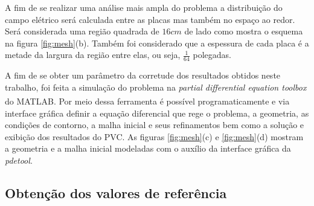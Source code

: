 \documentclass[
    12pt,               %
    openright,          %
    oneside,
    a4paper,            %
    english,            %
    french,             %
    spanish,            %
    brazil              %
    ]{abntex2}
\newcommand{\matlab}{MATLAB\textsuperscript{\textregistered}}
\begin{document}
A fim de se realizar uma análise mais ampla do problema a distribuição do campo elétrico será calculada entre as placas mas também no espaço ao redor. Será considerada uma região quadrada de $16cm$ de lado como mostra o esquema na figura \ref{fig:mesh}{(b)}. Também foi considerado que a espessura de cada placa é a metade da largura da região entre elas, ou seja, $\frac{1}{64}$ polegadas.


A fim de se obter um parâmetro da corretude dos resultados obtidos neste trabalho, foi feita a simulação do problema na \textit{partial differential equation toolbox} do \matlab. Por meio dessa ferramenta é possível programaticamente e via interface gráfica definir a equação diferencial que rege o problema, a geometria, as condições de contorno, a malha inicial e seus refinamentos bem como a solução e exibição dos resultados do PVC. As figuras \ref{fig:mesh}{(c)} e \ref{fig:mesh}{(d)} mostram a geometria e a malha inicial modeladas com o auxílio da interface gráfica da \textit{pdetool}.

\subsection{Obtenção dos valores de referência}
\end{document}
